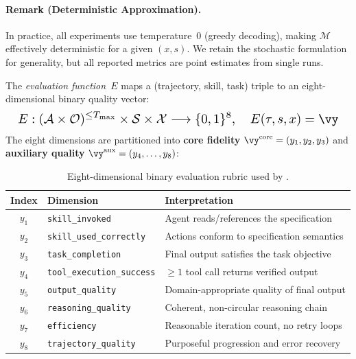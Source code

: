 \paragraph{Remark (Deterministic Approximation).}
In practice, all experiments use temperature~0 (greedy decoding), making $\mathcal{M}$ effectively deterministic for a given $(x, s)$.
We retain the stochastic formulation for generality, but all reported metrics are point estimates from single runs.

\begin{definition}
\label{def:eval}
The \emph{evaluation function}~$E$ maps a (trajectory, skill, task) triple to an eight-dimensional binary quality vector:
\begin{equation}
    \resizebox{0.97\columnwidth}{!}{$\displaystyle
        E: (\mathcal{A} \times \mathcal{O})^{\leq T_{\max}} \times \mathcal{S} \times \mathcal{X}
        \longrightarrow \{0,1\}^8, \quad
        E(\tau, s, x) = \vy
    $}
    \label{eq:eval_fn}
\end{equation}
The eight dimensions are partitioned into \textbf{core fidelity} $\vy^{\text{core}} = (y_1, y_2, y_3)$ and \textbf{auxiliary quality} $\vy^{\text{aux}} = (y_4, \ldots, y_8)$:
\end{definition}

\begin{table}[t]
\centering
\small
\caption{Eight-dimensional binary evaluation rubric used by \medskillbench.}
\begin{tabular}{@{}clp{}@{}}
\toprule
Index & Dimension & Interpretation \\
\midrule
$y_1$ & \texttt{skill\_invoked} & Agent reads/references the specification \\
$y_2$ & \texttt{skill\_used\_correctly} & Actions conform to specification semantics \\
$y_3$ & \texttt{task\_completion} & Final output satisfies the task objective \\
$y_4$ & \texttt{tool\_execution\_success} & $\geq 1$ tool call returns verified output \\
$y_5$ & \texttt{output\_quality} & Domain-appropriate quality of final output \\
$y_6$ & \texttt{reasoning\_quality} & Coherent, non-circular reasoning chain \\
$y_7$ & \texttt{efficiency} & Reasonable iteration count, no retry loops \\
$y_8$ & \texttt{trajectory\_quality} & Purposeful progression and error recovery \\
\bottomrule
\end{tabular}
\end{table}

